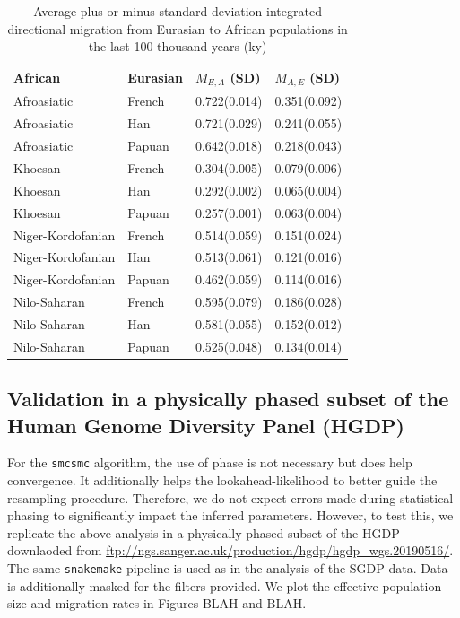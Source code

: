 \documentclass{article}
\begin{document}
\begin{table}[ht]
	\centering
	\begin{tabular}{llll}
		\hline
		African & Eurasian & $M_{E, A}$ (SD) & $M_{A, E}$ (SD) \\ 
		\hline
		Afroasiatic & French & 0.722(0.014) & 0.351(0.092) \\ 
		Afroasiatic & Han & 0.721(0.029) & 0.241(0.055) \\ 
		Afroasiatic & Papuan & 0.642(0.018) & 0.218(0.043) \\ 
		Khoesan & French & 0.304(0.005) & 0.079(0.006) \\ 
		Khoesan & Han & 0.292(0.002) & 0.065(0.004) \\ 
		Khoesan & Papuan & 0.257(0.001) & 0.063(0.004) \\ 
		Niger-Kordofanian & French & 0.514(0.059) & 0.151(0.024) \\ 
		Niger-Kordofanian & Han & 0.513(0.061) & 0.121(0.016) \\ 
		Niger-Kordofanian & Papuan & 0.462(0.059) & 0.114(0.016) \\ 
		Nilo-Saharan & French & 0.595(0.079) & 0.186(0.028) \\ 
		Nilo-Saharan & Han & 0.581(0.055) & 0.152(0.012) \\ 
		Nilo-Saharan & Papuan & 0.525(0.048) & 0.134(0.014) \\ 
		\hline
	\end{tabular}
	\caption{Average plus or minus standard deviation integrated directional migration from Eurasian to African populations in the last 100 thousand years (ky)} 
	\label{average_sgdp_migration_table}
\end{table}

\subsection{Validation in a physically phased subset of the Human Genome Diversity Panel (HGDP)} \label{hgdp_section}

For the {\tt smcsmc} algorithm, the use of phase is not necessary but does help convergence. It additionally helps the lookahead-likelihood to better guide the resampling procedure. Therefore, we do not expect errors made during statistical phasing to significantly impact the inferred parameters. However, to test this, we replicate the above analysis in a physically phased subset of the HGDP downlaoded from \url{ftp://ngs.sanger.ac.uk/production/hgdp/hgdp_wgs.20190516/}. The same {\tt snakemake} pipeline is used as in the analysis of the SGDP data. Data is additionally masked for the filters provided. We plot the effective population size and migration rates in Figures BLAH and BLAH.
\end{document}
